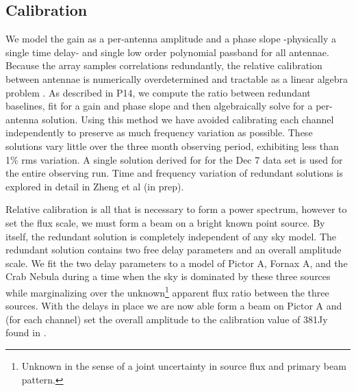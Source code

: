 \documentclass[preprint]{aastex}
\begin{document}
\subsection{Calibration}
We model the gain as a per-antenna amplitude and a phase slope -physically a single time delay- and single low order polynomial passband for all antennae.  Because the array samples correlations redundantly, the relative calibration between antennae is numerically overdetermined and tractable as a linear algebra problem \cite{Liu:2010p10391}.  As described in P14, we compute the ratio between redundant baselines, fit for a gain and phase slope and then algebraically solve for a per-antenna solution.  Using this method we have avoided calibrating each channel independently to preserve as much frequency variation as possible.   These solutions vary little over the three month observing period, exhibiting less than 1\% rms variation. A single solution derived for for the Dec 7 data set is used for the entire observing run. Time and frequency variation of redundant solutions is explored in detail in Zheng et al (in prep).  

Relative calibration is all that is necessary to form a power spectrum, however to set the flux scale, we must form a beam on a bright known point source.  By itself, the redundant solution is completely independent of any sky model. The redundant solution contains two free delay parameters and an overall amplitude scale. We fit the two delay parameters to a model of Pictor A, Fornax A, and the Crab Nebula during a time when the sky is dominated by these three sources while marginalizing over the unknown\footnote{Unknown in the sense of a joint uncertainty in source flux and primary beam pattern.} apparent flux ratio between the three sources. With the delays in place we are now able form a beam on Pictor A and (for each channel) set the overall amplitude to the calibration value of 381Jy found in \cite{jacobs:2013b}.
  
\end{document}
